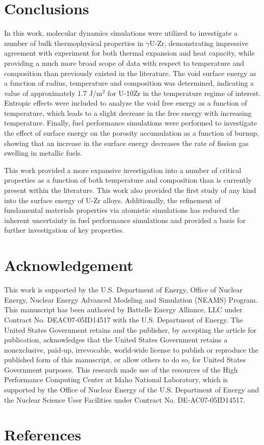 \documentclass[review]{elsarticle}
\begin{document}
\FloatBarrier

\section{Conclusions}

In this work, molecular dynamics simulations were utilized to investigate a number of bulk thermophysical properties in $\gamma$U-Zr, demonstrating impressive agreement with experiment for both thermal expansion and heat capacity, while providing a much more broad scope of data with respect to temperature and composition than previously existed in the literature. The void surface energy as a function of radius, temperature and composition was determined, indicating a value of approximately 1.7 J/m$^2$ for U-10Zr in the temperature regime of interest. Entropic effects were included to analyze the void free energy as a function of temperature, which leads to a slight decrease in the free energy with increasing temperature. Finally, fuel performance simulations were performed to investigate the effect of surface energy on the porosity accumulation as a function of burnup, showing that an increase in the surface energy decreases the rate of fission gas swelling in metallic fuels. 

This work provided a more expansive investigation into a number of critical properties as a function of both temperature and composition than is currently present within the literature. This work also provided the first study of any kind into the surface energy of U-Zr alloys. Additionally, the refinement of fundamental materials properties via atomistic simulations has reduced the inherent uncertainty in fuel performance simulations and provided a basis for further investigation of key properties.


\section{Acknowledgement}
This work is supported by the U.S. Department of Energy, Office of Nuclear Energy, Nuclear Energy Advanced Modeling and Simulation (NEAMS) Program. This manuscript has been authored by Battelle Energy Alliance, LLC under Contract No. DEAC07-05ID14517 with the U.S. Department of Energy. The United States Government retains and the publisher, by accepting the article for publication, acknowledges that the United States Government retains a nonexclusive, paid-up, irrevocable, world-wide license to publish or reproduce the published form of this manuscript, or allow others to do so, for United States Government purposes. This research made use of the resources of the High Performance Computing Center at Idaho National Laboratory, which is supported by the Office of Nuclear Energy of the U.S. Department of Energy and the Nuclear Science User Facilities under Contract No. DE-AC07-05ID14517.



\section{References}


\end{document}
